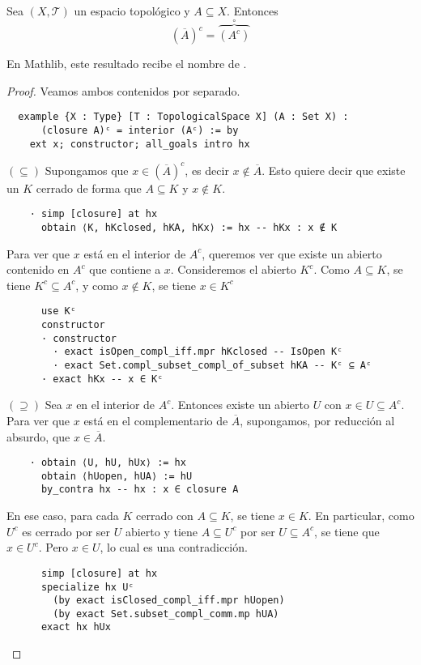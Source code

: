 \begin{proposition}
  Sea $(X, \mathcal{T})$ un espacio topológico y $A \subseteq X$. Entonces
  $$
  (\overline{A})^c = \overset{\circ}{\overbrace{(A^c)}} 
  $$
\end{proposition}

En Mathlib, este resultado recibe el nombre de .

\begin{proof}
  Veamos ambos contenidos por separado.

  \begin{lstlisting}
  example {X : Type} [T : TopologicalSpace X] (A : Set X) :
      (closure A)ᶜ = interior (Aᶜ) := by
    ext x; constructor; all_goals intro hx \end{lstlisting}
  
  $(\subseteq)$ Supongamos que $x \in (\overline{A})^c$, es decir $x \notin \overline{A}$. Esto quiere decir que existe un $K$ cerrado de forma que $A \subseteq K$ y $x \notin K$.

  \begin{lstlisting}
    · simp [closure] at hx
      obtain ⟨K, hKclosed, hKA, hKx⟩ := hx -- hKx : x ∉ K \end{lstlisting}
  
  Para ver que $x$ está en el interior de $A^c$, queremos ver que existe un abierto contenido en $A^c$ que contiene a $x$. Consideremos el abierto $K^c$. Como $A \subseteq K$, se tiene $K^c \subseteq A^c$, y como $x \notin K$, se tiene $x \in K^c$

  \begin{lstlisting}
      use Kᶜ 
      constructor
      · constructor
        · exact isOpen_compl_iff.mpr hKclosed -- IsOpen Kᶜ
        · exact Set.compl_subset_compl_of_subset hKA -- Kᶜ ⊆ Aᶜ
      · exact hKx -- x ∈ Kᶜ \end{lstlisting}

  $(\supseteq)$ Sea $x$ en el interior de $A^c$. Entonces existe un abierto $U$ con $x \in U \subseteq A^c$. Para ver que $x$ está en el complementario de $\overline{A}$, supongamos, por reducción al absurdo, que $x \in \overline{A}$.

  \begin{lstlisting}
    · obtain ⟨U, hU, hUx⟩ := hx
      obtain ⟨hUopen, hUA⟩ := hU
      by_contra hx -- hx : x ∈ closure A \end{lstlisting}

  En ese caso, para cada $K$ cerrado con $A \subseteq K$, se tiene $x \in K$. En particular, como $U^c$ es cerrado por ser $U$ abierto y tiene $A \subseteq U^c$ por ser $U \subseteq A^c$, se tiene que $x \in U^c$. Pero $x \in U$, lo cual es una contradicción.

  \begin{lstlisting}
      simp [closure] at hx
      specialize hx Uᶜ
        (by exact isClosed_compl_iff.mpr hUopen)
        (by exact Set.subset_compl_comm.mp hUA)
      exact hx hUx \end{lstlisting}
\end{proof}


